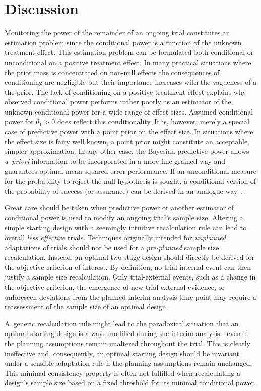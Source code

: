 \documentclass[12pt]{article}
\begin{document}
\section{Discussion} %

Monitoring the power of the remainder of an ongoing trial constitutes an estimation problem since the conditional power
is a function of the unknown treatment effect.
This estimation problem can be formulated both conditional or unconditional on a positive treatment effect.
In many practical situations where the prior mass is concentrated on non-null effects the consequences of conditioning are negligible but their importance increases with the vagueness of a the prior.
The lack of conditioning on a positive treatment effect explains why observed conditional power performs rather poorly as an estimator of the unknown conditional power for a wide range of effect sizes.
Assumed conditional power for $\theta_1>0$ does reflect this conditionality.
It is, however,
merely a special case of predictive power with a
point prior on the effect size.
In situations where the effect size is fairy well known, a point prior might constitute an acceptable, simpler approximation.
In any other case, the Bayesian predictive power allows \textit{a~priori} information to be incorporated in a more fine-grained way and
guarantees optimal mean-squared-error performance.
If an unconditional measure for the probability to reject the null hypothesis is sought,
a conditional version of the probability of success (or assurance) can be derived in an analogue way~\cite{kunzmann2020}.

Great care should be taken when predictive power
or another estimator of conditional power
is used to modify an ongoing trial's sample size.
Altering a simple starting design with a seemingly intuitive recalculation rule
can lead to overall \emph{less effective} trials.
Techniques originally intended for \emph{unplanned} adaptations of trials
should not be used for a \emph{pre-planned} sample size recalculation.
Instead, an optimal two-stage design should directly be derived
for the objective criterion of interest.
By definition, no trial-internal event can then justify a sample size recalculation.
Only trial-external events, such as a change in the objective criterion,
the emergence of new trial-external evidence,
or unforeseen deviations from the planned interim analysis time-point
may require a reassessment of the sample size of an optimal design.

A~generic recalculation rule might lead to the paradoxical situation that an optimal
starting design is always modified during the interim analysis
- even if the planning assumptions remain unaltered throughout the trial.
This is clearly ineffective and, consequently,
an optimal starting design should be invariant under a sensible adaptation rule
if the planning assumptions remain unchanged.
This minimal consistency property is often not fulfilled when recalculating a design's
sample size based on a fixed threshold for its minimal conditional power.
\end{document}
